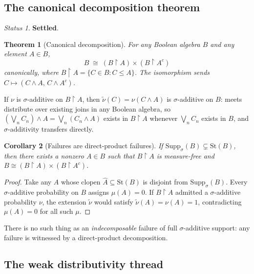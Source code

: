 \documentclass[11pt]{article}
\newtheorem{theorem}{Theorem}
\newtheorem{corollary}[theorem]{Corollary}
\theoremstyle{definition}
\theoremstyle{remark}
\newtheorem*{status}{Status}
\newcommand{\St}{\mathrm{St}}
\newcommand{\Supp}{\mathrm{Supp}_\sigma}
\newcommand{\BA}{B{\upharpoonright}A}
\newcommand{\BAc}{B{\upharpoonright}A^c}
\begin{document}
\subsection{The canonical decomposition theorem}

\begin{status}
\textbf{Settled}.
\end{status}

\begin{theorem}[Canonical decomposition]
For any Boolean algebra $B$ and any element $A \in B$,
\[
  B \;\cong\; (\BA) \times (\BAc)
\]
canonically, where $\BA = \{C \in B : C \leq A\}$. The isomorphism sends
$C \mapsto (C \wedge A,\, C \wedge A^c)$.
\end{theorem}

If $\nu$ is $\sigma$-additive on $\BA$, then $\tilde\nu(C) = \nu(C \wedge A)$
is $\sigma$-additive on $B$: meets distribute over existing joins in any Boolean
algebra, so $(\bigvee_n C_n)\wedge A = \bigvee_n(C_n\wedge A)$ exists in $\BA$
whenever $\bigvee_n C_n$ exists in $B$, and $\sigma$-additivity transfers directly.

\begin{corollary}[Failures are direct-product failures]
If $\Supp(B) \subsetneq \St(B)$, then there exists a nonzero $A \in B$ such that
$\BA$ is measure-free and $B \cong (\BA)\times(\BAc)$.
\end{corollary}

\begin{proof}
Take any $A$ whose clopen $\hat A \subseteq \St(B)$ is disjoint from $\Supp(B)$.
Every $\sigma$-additive probability on $B$ assigns $\mu(A) = 0$. If $\BA$ admitted
a $\sigma$-additive probability $\nu$, the extension $\tilde\nu$ would satisfy
$\tilde\nu(A) = \nu(A) = 1$, contradicting $\mu(A)=0$ for all such $\mu$.
\end{proof}

\noindent
There is no such thing as an \emph{indecomposable} failure of full $\sigma$-additive
support: any failure is witnessed by a direct-product decomposition.

\subsection{The weak distributivity thread}
\end{document}
